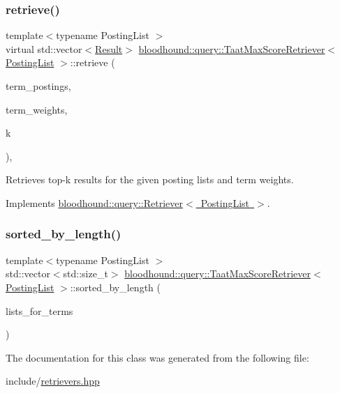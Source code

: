 \subsubsection{\texorpdfstring{retrieve()}{retrieve()}}
{\footnotesize\ttfamily template$<$typename Posting\+List $>$ \\
virtual std\+::vector$<$\mbox{\hyperlink{structbloodhound_1_1query_1_1Result}{Result}}$>$ \mbox{\hyperlink{classbloodhound_1_1query_1_1TaatMaxScoreRetriever}{bloodhound\+::query\+::\+Taat\+Max\+Score\+Retriever}}$<$ \mbox{\hyperlink{classbloodhound_1_1PostingList}{Posting\+List}} $>$\+::retrieve (\begin{DoxyParamCaption}\item[{const std\+::vector$<$ \mbox{\hyperlink{classbloodhound_1_1PostingList}{Posting\+List}} $>$ \&}]{term\+\_\+postings,  }\item[{const std\+::vector$<$ \mbox{\hyperlink{structbloodhound_1_1Score}{Score}} $>$ \&}]{term\+\_\+weights,  }\item[{std\+::size\+\_\+t}]{k }\end{DoxyParamCaption})\hspace{0.3cm}{\ttfamily [inline]}, {\ttfamily [virtual]}}



Retrieves top-\/k results for the given posting lists and term weights. 



Implements \mbox{\hyperlink{classbloodhound_1_1query_1_1Retriever_ae3c6a4628c5580e620c213b3dcd47c2b}{bloodhound\+::query\+::\+Retriever$<$ Posting\+List $>$}}.

\mbox{\label{classbloodhound_1_1query_1_1TaatMaxScoreRetriever_a4c5253dee6541cf173f4f2e16803c702}} 
\subsubsection{\texorpdfstring{sorted\+\_\+by\+\_\+length()}{sorted\_by\_length()}}
{\footnotesize\ttfamily template$<$typename Posting\+List $>$ \\
std\+::vector$<$std\+::size\+\_\+t$>$ \mbox{\hyperlink{classbloodhound_1_1query_1_1TaatMaxScoreRetriever}{bloodhound\+::query\+::\+Taat\+Max\+Score\+Retriever}}$<$ \mbox{\hyperlink{classbloodhound_1_1PostingList}{Posting\+List}} $>$\+::sorted\+\_\+by\+\_\+length (\begin{DoxyParamCaption}\item[{const std\+::vector$<$ \mbox{\hyperlink{classbloodhound_1_1PostingList}{Posting\+List}} $>$ \&}]{lists\+\_\+for\+\_\+terms }\end{DoxyParamCaption})\hspace{0.3cm}{\ttfamily [inline]}}



The documentation for this class was generated from the following file\+:\begin{DoxyCompactItemize}
\item 
include/\mbox{\hyperlink{retrievers_8hpp}{retrievers.\+hpp}}\end{DoxyCompactItemize}
